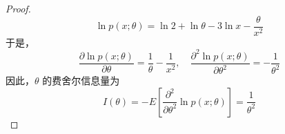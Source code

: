 \documentclass[normal,cn]{elegantnote}
\begin{document}
\begin{enumerate}
\begin{proof}
            \begin{equation*}
                \ln p\left(x;\theta\right)=\ln 2+\ln\theta-3\ln x-\frac{\theta}{x^{2}}
            \end{equation*}
            于是，
            \begin{equation*}
                \frac{\partial\ln p\left(x;\theta\right)}{\partial\theta}=\frac{1}{\theta}-\frac{1}{x^{2}},\quad\frac{\partial^{2}\ln p\left(x;\theta\right)}{\partial\theta^{2}}=-\frac{1}{\theta^{2}}
            \end{equation*}
            因此，$\theta$ 的费舍尔信息量为
            \begin{equation*}
                I\left(\theta\right)=-E\left[\frac{\partial^{2}}{\partial\theta^{2}}\ln p\left(x;\theta\right)\right]=\frac{1}{\theta^{2}}
            \end{equation*}
        \end{proof}
\end{enumerate}
\end{document}
